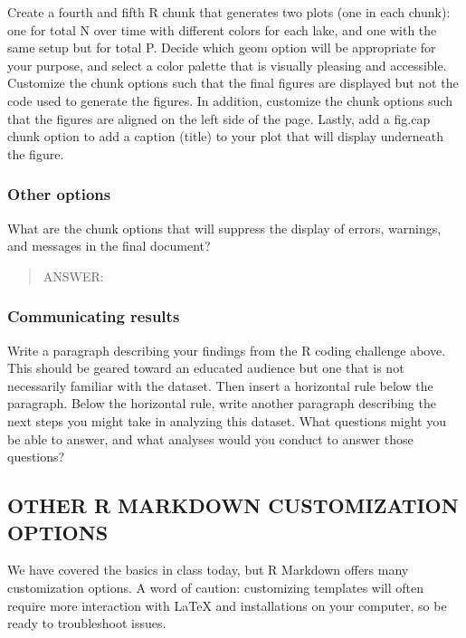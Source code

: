 \documentclass[]{article}
\begin{document}
Create a fourth and fifth R chunk that generates two plots (one in each
chunk): one for total N over time with different colors for each lake,
and one with the same setup but for total P. Decide which geom option
will be appropriate for your purpose, and select a color palette that is
visually pleasing and accessible. Customize the chunk options such that
the final figures are displayed but not the code used to generate the
figures. In addition, customize the chunk options such that the figures
are aligned on the left side of the page. Lastly, add a fig.cap chunk
option to add a caption (title) to your plot that will display
underneath the figure.

\subsubsection{Other options}\label{other-options}

What are the chunk options that will suppress the display of errors,
warnings, and messages in the final document?

\begin{quote}
ANSWER:
\end{quote}

\subsubsection{Communicating results}\label{communicating-results}

Write a paragraph describing your findings from the R coding challenge
above. This should be geared toward an educated audience but one that is
not necessarily familiar with the dataset. Then insert a horizontal rule
below the paragraph. Below the horizontal rule, write another paragraph
describing the next steps you might take in analyzing this dataset. What
questions might you be able to answer, and what analyses would you
conduct to answer those questions?

\subsection{OTHER R MARKDOWN CUSTOMIZATION
OPTIONS}\label{other-r-markdown-customization-options}

We have covered the basics in class today, but R Markdown offers many
customization options. A word of caution: customizing templates will
often require more interaction with LaTeX and installations on your
computer, so be ready to troubleshoot issues.
\end{document}
